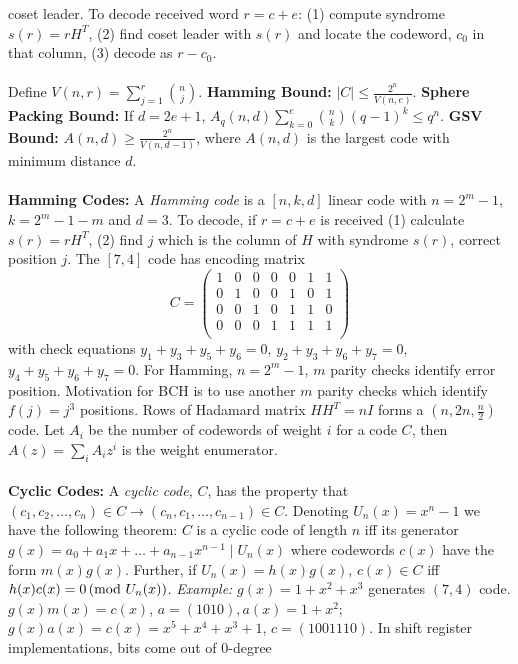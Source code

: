 coset leader. To decode received word $r=c+e$: (1) compute syndrome $s(r)= rH^T$,
(2) find coset leader with $s(r)$ and locate the codeword, $c_0$ in that column,
(3) decode as $r-c_0$.
\\
\\
Define $V(n,r)= \sum_{j=1}^r {n \choose j}$.
{\bf Hamming Bound:} $| C | \leq {\frac {2^n} {V(n,e)}}$.
{\bf Sphere Packing Bound:} If $d=2e+1$, $A_{q}(n,d) \sum_{k=0}^e {n \choose k}
(q-1)^{k} \leq q^{n}$.
{\bf GSV Bound:} $A(n,d) \geq {\frac {2^n} {V(n, d-1)}}$, where
$A(n,d)$ is the largest code with minimum distance $d$.
\\
\\
{\bf Hamming Codes:}
A \emph{Hamming code} is a $[n,k,d]$ linear code with
$n= 2^m -1$, $k= 2^m -1 -m$ and $d=3$.  To decode, if $r=c+e$ is received
(1) calculate $s(r)= rH^T$, (2) find $j$ which is the column of $H$ with syndrome
$s(r)$, correct position $j$.  The $[7,4]$ code has encoding matrix
$$
C=
\left(
\begin{array}{ccccccc}
1 & 0 & 0 & 0 & 0 & 1 & 1\\
0 & 1 & 0 & 0 & 1 & 0 & 1\\
0 & 0 & 1 & 0 & 1 & 1 & 0\\
0 & 0 & 0 & 1 & 1 & 1 & 1\\
\end{array}
\right)
$$
with check equations
$y_1+y_3+y_5+y_6 =0$,
$y_2+y_3+y_6+y_7 =0$,
$y_4+y_5+y_6+y_7 =0$.
For Hamming, $n= 2^m -1$, $m$ parity checks identify error position.  Motivation
for BCH is to use another $m$ parity checks which identify $f(j)= j^3$ positions.
Rows of Hadamard matrix $H H^{T}=nI$ forms a $(n, 2n, {\frac n 2})$ code.
Let $A_{i}$ be the number of codewords of weight $i$ for a code $C$, then
$A(z)= \sum_i A_{i} z^{i}$ is the weight enumerator.
\\
\\
{\bf Cyclic Codes:}
A \emph{cyclic code,} $C$, has the property that 
$(c_1, c_2, \ldots , c_n) \in C \rightarrow
(c_n, c_1, \ldots , c_{n-1}) \in C$.  Denoting $U_n(x)= x^n -1$ we have the following 
theorem:  $C$ is a cyclic code of length $n$ iff its generator 
$g(x)= a_0 + a_1 x + \ldots + a_{n-1}x^{n-1} \mid U_n(x)$ where codewords $c(x)$
have the form $m(x) g(x)$.  Further, if $U_n(x)= h(x) g(x)$, $c(x) \in C$ iff
$h(x)c(x) = 0 \thinspace \textnormal{(mod } U_n(x) \textnormal{)}$.
\emph{Example:} $g(x)= 1+x^2+x^3$ generates $(7,4)$ code.
$g(x)m(x)=c(x)$, $a=(1010), a(x)= 1+x^2$; $g(x) a(x) = c(x)= x^5 + x^4 + x^3 +1$,
$c= (1001110)$.  In shift register implementations, bits come out of $0$-degree
